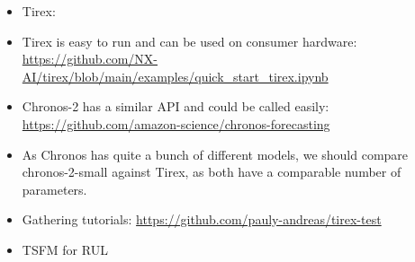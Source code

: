 \begin{itemize}
	\item Tirex: \cite{tirex} \cite{tirex-2}
    \item Tirex is easy to run and can be used on consumer hardware: \url{https://github.com/NX-AI/tirex/blob/main/examples/quick_start_tirex.ipynb}
    \item Chronos-2 has a similar API and could be called easily: \url{https://github.com/amazon-science/chronos-forecasting} 
    \item As Chronos has quite a bunch of different models, we should compare chronos-2-small against Tirex, as both have a comparable number of parameters. 
    \item Gathering tutorials: \url{https://github.com/pauly-andreas/tirex-test}
    \item TSFM for RUL \cite{tsfm-rul}
\end{itemize}